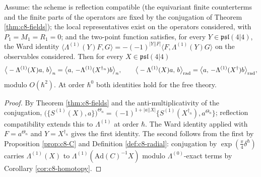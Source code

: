 \begin{theorem}[Adjointness]
\label{thm:c8-adjoint}
Assume: the scheme is reflection compatible (the equivariant finite counterterms and the finite parts of the operators are fixed by the conjugation of Theorem \ref{thm:c8-fields}); the local representatives exist on the operators considered, with $P_1=M_1=R_1=0$; and the two-point function satisfies, for every $Y\in\mathfrak{psl}(4|4)$, the Ward identity $\langle\Lambda^{(1)}(Y)F,G\rangle=-(-1)^{|Y||F|}\langle F,\Lambda^{(1)}(Y)G\rangle$ on the observables considered. Then for every $X\in\mathfrak{psl}(4|4)$
\[
\big\langle-\Lambda^{(1)}(X)a,\,b\big\rangle_n=\big\langle a,\,-\Lambda^{(1)}(X^{\dagger_n})b\big\rangle_n,\qquad
\big\langle-\Lambda^{(1)}(X)a,\,b\big\rangle_{\rm rad}=\big\langle a,\,-\Lambda^{(1)}(X^{\dagger})b\big\rangle_{\rm rad},
\]
modulo $O(\hbar^2)$. At order $\hbar^0$ both identities hold for the free theory.
\end{theorem}

\begin{proof}
By Theorem \ref{thm:c8-fields} and the anti-multiplicativity of the conjugation, $\big(\{S^{(1)}(X),a\}\big)^{\Theta_n}=(-1)^{1+|a||X|}\{S^{(1)}(X^{\dagger_n}),a^{\Theta_n}\}$; reflection compatibility extends this to $\Lambda^{(1)}$ at order $\hbar$. The Ward identity applied with $F=a^{\Theta_n}$ and $Y=X^{\dagger_n}$ gives the first identity. The second follows from the first by Proposition \ref{prop:c8-C} and Definition \ref{def:c8-radial}: conjugation by $\exp(\tfrac\pi4\delta^\hbar)$ carries $\Lambda^{(1)}(X)$ to $\Lambda^{(1)}(\mathrm{Ad}(C)^{-1}X)$ modulo $\Lambda^{(0)}$-exact terms by Corollary \ref{cor:c8-homotopy}.
\end{proof}

